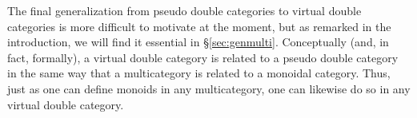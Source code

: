 \documentclass{tac}
\newcommand{\V}{\ensuremath{\mathbf{V}}}
\newcommand{\mb}[1]{{\mathbf{#1}}}
\newcommand{\mat}[1]{\mathbf{#1}\mbox{-}\mathcal{M}\mathit{at}}
\newcommand{\ten}{\otimes}
\numberwithin{equation}{section}
\begin{document}
The final generalization from pseudo double categories to virtual double
categories is more difficult to motivate at the moment, but as remarked
in the introduction, we will find it essential in \S\ref{sec:genmulti}.
Conceptually (and, in fact, formally), a virtual double category is
related to a pseudo double category in the same way that a multicategory
is related to a monoidal category.  Thus, just as one can define monoids
in any multicategory, one can likewise do so in any virtual double
category.

\end{document}
